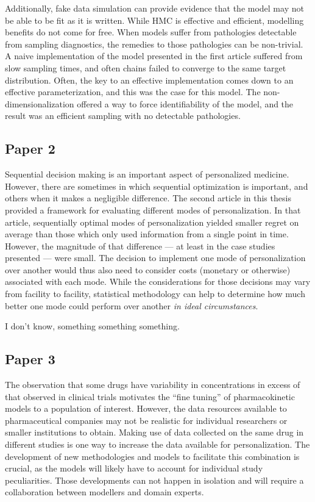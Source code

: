 Additionally, fake data simulation can provide evidence that the model may not be able to be fit as it is written.  While HMC is effective and efficient, modelling benefits do not come for free.  When models suffer from pathologies detectable from sampling diagnostics, the remedies to those pathologies can be non-trivial. A naive implementation of the model presented in the first article suffered from slow sampling times, and often chains failed to converge to the same target distribution.  Often, the key to an effective implementation comes down to an effective parameterization, and this was the case for this model.  The non-dimensionalization offered a way to force identifiability of the model, and the result was an efficient sampling with no detectable pathologies.

\subsection{Paper 2}

Sequential decision making is an important aspect of personalized medicine.  However, there are sometimes in which sequential optimization is important, and others when it makes a negligible difference.  The second article in this thesis  provided a framework for evaluating different modes of personalization.  In that article, sequentially optimal modes of personalization yielded smaller regret on average than those which only used information from a single point in time.  However, the magnitude of that difference --- at least in the case studies presented --- were small.  The decision to implement one mode of personalization over another would thus also need to consider costs (monetary or otherwise) associated with each mode. While the considerations for those decisions may vary from facility to facility, statistical methodology can help to determine how much better one mode could perform over another \textit{in ideal circumstances}.

I don't know, something something something.

\subsection{Paper 3}

The observation that some drugs have variability in concentrations in excess of that observed in clinical trials motivates the ``fine tuning'' of pharmacokinetic models to a population of interest.  However, the data resources available to pharmaceutical companies may not be realistic for individual researchers or smaller institutions to obtain.  Making use of data collected on the same drug in different studies is one way to increase the data available for personalization.  The development of new methodologies and models to facilitate this combination is crucial, as the models will likely have to account for individual study peculiarities. Those developments can not happen in isolation and will require a collaboration between modellers and domain experts.

